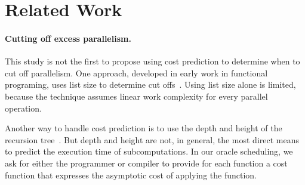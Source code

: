 \section{Related Work}
\label{sec:related-work}

\paragraph{Cutting off excess parallelism.}

This study is not the first to propose using cost prediction to
determine when to cut off parallelism.  One approach, developed in
early work in functional programing, uses list size to determine cut
offs~\cite{HuelsbergenLaAi94}. Using list size alone is limited,
because the technique assumes linear work complexity for every
parallel operation.

Another way to handle cost prediction is to use the depth and height
of the recursion tree~\cite{Weening89,PehoushekWe90}. But depth and
height are not, in general, the most direct means to predict the
execution time of subcomputations. In our oracle scheduling, we ask
for either the programmer or compiler to provide for each function a
cost function that expresses the asymptotic cost of applying the
function.

